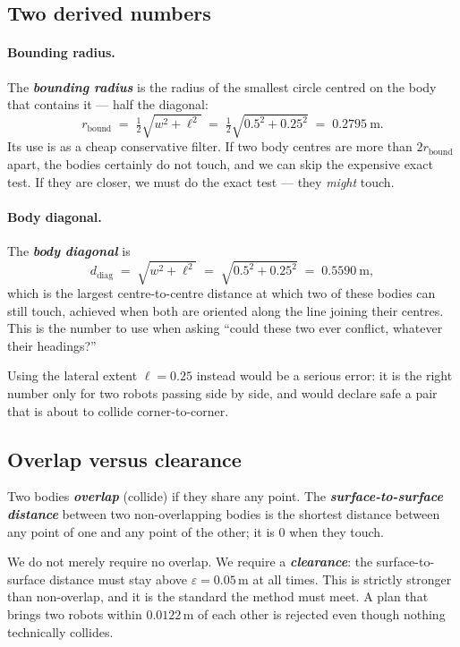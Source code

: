 \documentclass[11pt,a4paper]{article}
\newcommand{\defn}[1]{\textbf{\textit{#1}}}
\begin{document}
\subsection{Two derived numbers}

\paragraph{Bounding radius.} The \defn{bounding radius} is the radius of the smallest circle
centred on the body that contains it --- half the diagonal:
\[
r_{\mathrm{bound}} \;=\; \tfrac{1}{2}\sqrt{w^2 + \ell^2}
\;=\; \tfrac{1}{2}\sqrt{0.5^2 + 0.25^2} \;=\; 0.2795\ \text{m}.
\]
Its use is as a cheap conservative filter. If two body centres are more than
$2 r_{\mathrm{bound}}$ apart, the bodies certainly do not touch, and we can skip the
expensive exact test. If they are closer, we must do the exact test --- they \emph{might}
touch.

\paragraph{Body diagonal.} The \defn{body diagonal} is
\[
d_{\mathrm{diag}} \;=\; \sqrt{w^2 + \ell^2} \;=\; \sqrt{0.5^2 + 0.25^2} \;=\; 0.5590\ \text{m},
\]
which is the largest centre-to-centre distance at which two of these bodies can still touch,
achieved when both are oriented along the line joining their centres. This is the number to
use when asking ``could these two ever conflict, whatever their headings?''

Using the lateral extent $\ell = 0.25$ instead would be a serious error: it is the right
number only for two robots passing side by side, and would declare safe a pair that is
about to collide corner-to-corner.

\subsection{Overlap versus clearance}

Two bodies \defn{overlap} (collide) if they share any point. The
\defn{surface-to-surface distance} between two non-overlapping bodies is the shortest
distance between any point of one and any point of the other; it is $0$ when they touch.

We do not merely require no overlap. We require a \defn{clearance}: the
surface-to-surface distance must stay above $\varepsilon = 0.05$\,m at all times. This is
strictly stronger than non-overlap, and it is the standard the method must meet. A plan that
brings two robots within $0.0122$\,m of each other is rejected even though nothing
technically collides.
\end{document}

